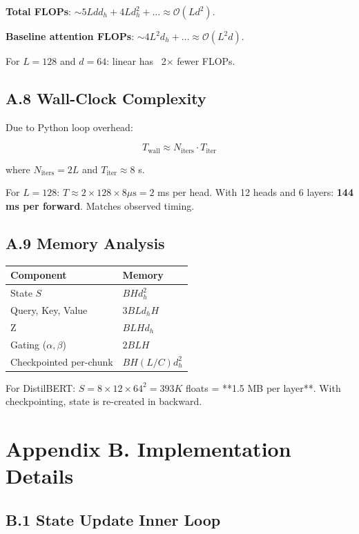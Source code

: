 \textbf{Total FLOPs}: $\sim 5 L d d_h + 4 L d_h^2 + \dots \approx \mathcal{O}(L d^2)$.

\textbf{Baseline attention FLOPs}: $\sim 4 L^2 d_h + \dots \approx \mathcal{O}(L^2 d)$.

For $L = 128$ and $d = 64$: linear has ~2$\times$ fewer FLOPs.

\subsection{A.8 Wall-Clock Complexity}

Due to Python loop overhead:

\[
T_\text{wall} \approx N_\text{iters} \cdot T_\text{iter}
\tag{A.8}
\]

where $N_\text{iters} = 2L$ and $T_\text{iter} \approx 8$  s.

For $L = 128$: $T \approx 2 \times 128 \times 8 \mu\text{s} = 2$ ms per 
head. With 12 heads and 6 layers: \textbf{144 ms per forward}. Matches observed 
timing.

\subsection{A.9 Memory Analysis}

\begin{table}[H]
\centering
\small
\begin{tabular}{ll}
\toprule
\textbf{Component} & \textbf{Memory} \\
\midrule
State $S$ & $B H d_h^2$ \\
Query, Key, Value & $3 B L d_h H$ \\
Z & $B L H d_h$ \\
Gating ($\alpha, \beta$) & $2 B L H$ \\
Checkpointed per-chunk & $B H (L/C) d_h^2$ \\
\bottomrule
\end{tabular}
\end{table}

For DistilBERT: $S = 8 \times 12 \times 64^2 = 393K$ floats = **1.5 MB per 
layer**. With checkpointing, state is re-created in backward.




\section{Appendix B. Implementation Details}

\subsection{B.1 State Update Inner Loop}

